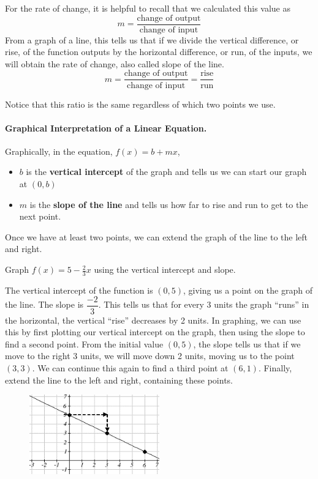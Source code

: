 For the rate of change, it is helpful to recall that we calculated this value as
$$m = \frac{\mbox{change of output}}{\mbox{change of input}}$$
From a graph of a line, this tells us that if we divide the vertical
difference, or rise, of the function outputs by the horizontal
difference, or run, of the inputs, we will obtain the rate of change,
also called slope of the line.
$$m = \frac{\mbox{change of output}}{\mbox{change of input}} = \frac{\mbox{rise}}{\mbox{run}}$$


Notice that this ratio is the same regardless of which two points we use.

\paragraph{Graphical Interpretation of a Linear Equation.} Graphically, in the equation, $f(x) = b+mx$,
  \begin{itemize}
    \item $b$ is the \textbf{vertical intercept} of the graph and tells us we can start our graph at $(0, b)$
    \item $m$ is the \textbf{slope of the line} and tells us how far to rise and run to get to the next point.
  \end{itemize}
Once we have at least two points, we can extend the graph of the line to the left and right.

\begin{example}
Graph $f(x) = 5 - \frac{2}{3} x$ using the vertical intercept and slope.

\begin{solution} The vertical intercept of the function is $(0, 5)$, giving us a point on the graph of the line. The slope is $\dfrac{-2}{3}$. This tells us that for every 3 units the graph ``runs'' in the horizontal, the vertical ``rise'' decreases by 2 units. In graphing, we can use this by first plotting our vertical intercept on the graph, then using the slope to find a second point. From the initial value $(0, 5)$, the slope tells us that if we move to the right 3 units, we will move down 2 units, moving us to the point $(3, 3)$. We can continue this again to find a  third point at $(6, 1)$. Finally, extend the line to the left and right, containing these points.
\begin{figure}[!ht]
\centering
\includegraphics[width=0.5\textwidth]{img/chap1/sec1-4/image049.png}
\caption{}
\end{figure}
\end{solution}\end{example}

